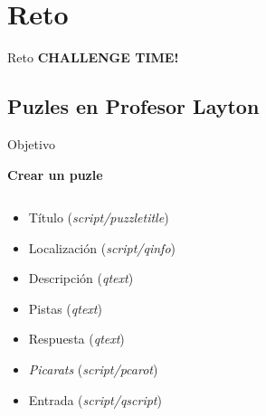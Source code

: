 \section{Reto}
\begin{frame}{Reto}
    \Huge\centering\textbf{CHALLENGE TIME!}
\end{frame}

\subsection{Puzles en Profesor Layton}
\begin{frame}{Objetivo}

    {\Large\bfseries Crear un puzle}
    \begin{columns}
    \begin{column}{0.5\textwidth}
        \begin{itemize}
            \item<1-> Título (\textit{script/puzzletitle})
            \item<2-> Localización (\textit{script/qinfo})
            \item<3-> Descripción (\textit{qtext})
            \item<4-> Pistas (\textit{qtext})
            \item<5-> Respuesta (\textit{qtext})
            \item<6-> \textit{Picarats} (\textit{script/pcarot})
            \item<7-> Entrada (\textit{script/qscript})
        \end{itemize}
    \end{column}
    \begin{column}{0.5\textwidth}

\end{column}
\end{columns}
\end{frame}
